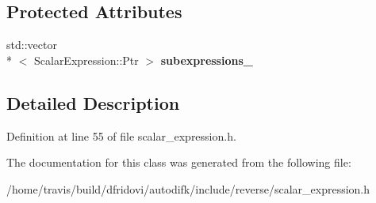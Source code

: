 \subsection*{Protected Attributes}
\begin{DoxyCompactItemize}
\item 
\hypertarget{classautodifk_1_1reverse_1_1_scalar_expression_a948076a05d2f5e36a48ee597c5c91d2d}{std\-::vector\\*
$<$ Scalar\-Expression\-::\-Ptr $>$ {\bfseries subexpressions\-\_\-}}\label{classautodifk_1_1reverse_1_1_scalar_expression_a948076a05d2f5e36a48ee597c5c91d2d}

\end{DoxyCompactItemize}


\subsection{Detailed Description}


Definition at line 55 of file scalar\-\_\-expression.\-h.



The documentation for this class was generated from the following file\-:\begin{DoxyCompactItemize}
\item 
/home/travis/build/dfridovi/autodifk/include/reverse/scalar\-\_\-expression.\-h\end{DoxyCompactItemize}
